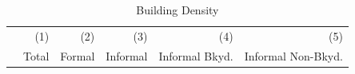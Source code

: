 \documentclass[12pt]{article}
\begin{document}






\begin{table}
\caption{Building Density}
\begin{tabular}{lDDDDD}
\toprule
 & \small (1) & \small (2)  & \small (3) & \small (4) & \small (5) \\
 & Total & Formal  & Informal & Informal Bkyd. & Informal Non-Bkyd. \\ \midrule

\midrule

\bottomrule
\end{tabular}
\end{table}





% 
% 
\end{document}
